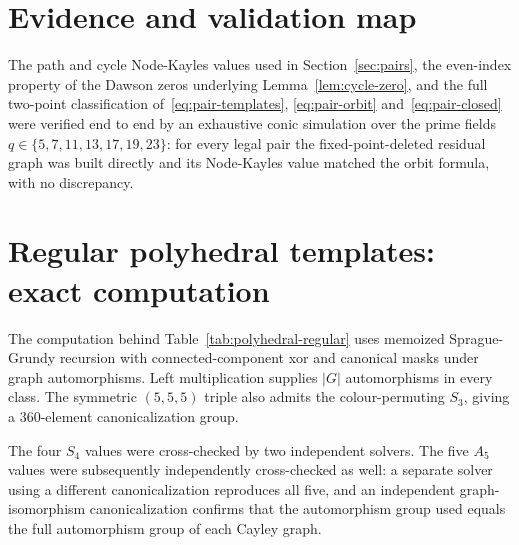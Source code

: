 \documentclass[11pt]{article}
\theoremstyle{definition}
\theoremstyle{remark}
\newif\ifdraftnotes
\newcommand{\phasenote}[2]{%
  \ifdraftnotes
    \par\smallskip\noindent
    \fbox{\parbox{0.96\linewidth}{\footnotesize\textbf{[#1 owed]}\ #2}}%
    \par\smallskip
  \fi}
\begin{document}
\phasenote{C311}{The Discussion is rewritten last, after the theorem boundary and the final title
are fixed (runbook migration table, current \S15 row).}

\appendix

\section{Evidence and validation map}
\label{app:evidence}

\phasenote{C307/C308}{This appendix is a structural placeholder. C307 populates it with the C281
dihedral census (all tame legal pairs and triples over prime $q\le23$) and the C288 polyhedral
embedding census (odd prime powers $q\le101$), together with the polyhedral edge lists and replay
counts displaced from Section~\ref{sec:polyhedral}. C308 adds the mixed-verification claim-route
map, the Lean adequacy statement, and the provenance boundary. C309 adds the regeneration commands
and manifest hashes. Censuses are validation evidence, not narrative spine.}

The path and cycle Node-Kayles values used in Section~\ref{sec:pairs}, the even-index property of
the Dawson zeros underlying Lemma~\ref{lem:cycle-zero}, and the full two-point classification
of~\eqref{eq:pair-templates}, \eqref{eq:pair-orbit} and~\eqref{eq:pair-closed} were verified end to
end by an exhaustive conic simulation over the prime fields $q\in\{5,7,11,13,17,19,23\}$: for every
legal pair the fixed-point-deleted residual graph was built directly and its Node-Kayles value
matched the orbit formula, with no discrepancy.

\section{Regular polyhedral templates: exact computation}
\label{app:regular-computation}

The computation behind Table~\ref{tab:polyhedral-regular} uses memoized Sprague-Grundy recursion
with connected-component xor and canonical masks under graph automorphisms. Left multiplication
supplies $|G|$ automorphisms in every class. The symmetric $(5,5,5)$ triple also admits the
colour-permuting $S_3$, giving a $360$-element canonicalization group.

The four $S_4$ values were cross-checked by two independent solvers. The five $A_5$ values were
subsequently independently cross-checked as well: a separate solver using a different
canonicalization reproduces all five, and an independent graph-isomorphism canonicalization confirms
that the automorphism group used equals the full automorphism group of each Cayley graph.
\end{document}
